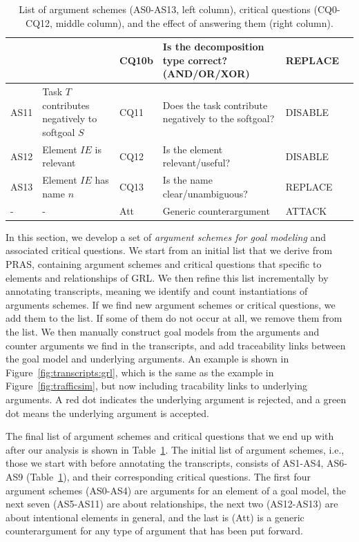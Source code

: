 \begin{table}[h]
\begin{tabularx}{\textwidth}{|l|l|l|X|l|l|}
 &  & CQ10b & Is the decomposition type correct? (AND/OR/XOR)& REPLACE\\
\hline
AS11 & Task $T$ contributes negatively to softgoal $S$& CQ11 & Does the task contribute negatively to the softgoal?& DISABLE\\
\hline
\hline
AS12 & Element $IE$ is relevant & CQ12 & Is the element relevant/useful? & DISABLE\\
\hline
AS13 & Element $IE$ has name $n$ & CQ13 & Is the name clear/unambiguous? & REPLACE\\
\hline
\hline
- & - & Att & Generic counterargument & ATTACK\\
\hline
\end{tabularx}
\caption{List of argument schemes (AS0-AS13, left column), critical questions (CQ0-CQ12, middle column), and the effect of answering them (right column).}
\label{table:argument-schemes}
\end{table}

In this section, we develop a set of \emph{argument schemes for goal modeling} and associated critical questions. We start from an initial list that we derive from PRAS, containing argument schemes and critical questions that specific to elements and relationships of GRL. We then refine this list incrementally by annotating transcripts, meaning we identify and count instantiations of arguments schemes. If we find new argument schemes or critical questions, we add them to the list. If some of them do not occur at all, we remove them from the list. We then manually construct goal models from the arguments and counter arguments we find in the transcripts, and add traceability links between the goal model and underlying arguments. An example is shown in Figure~\ref{fig:transcripts:grl}, which is the same as the example in Figure~\ref{fig:trafficsim}, but now including tracability links to underlying arguments. A red dot indicates the underlying argument is rejected, and a green dot means the underlying argument is accepted.

The final list of argument schemes and critical questions that we end up with after our analysis is shown in Table~\ref{table:argument-schemes}. The initial list of argument schemes, i.e., those we start with before annotating the transcripts, consists of AS1-AS4, AS6-AS9 (Table~\ref{table:argument-schemes}), and their corresponding critical questions. The first four argument schemes (AS0-AS4) are arguments for an element of a goal model, the next seven (AS5-AS11) are about relationships, the next two (AS12-AS13) are about intentional elements in general, and the last is (Att) is a generic counterargument for any type of argument that has been put forward.

